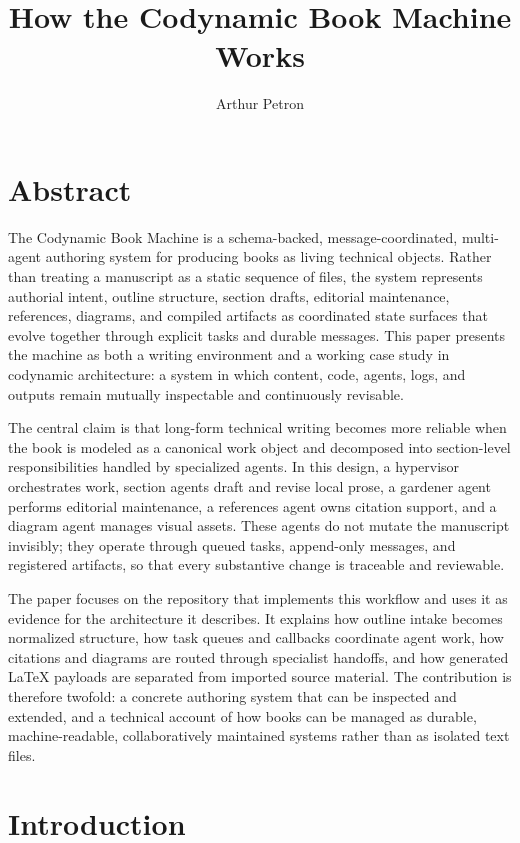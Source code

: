 \documentclass[11pt]{article}
\title{How the Codynamic Book Machine Works}
\author{Arthur Petron}
\begin{document}
\section{Abstract}


The Codynamic Book Machine is a schema-backed, message-coordinated, multi-agent authoring system for producing books as living technical objects. Rather than treating a manuscript as a static sequence of files, the system represents authorial intent, outline structure, section drafts, editorial maintenance, references, diagrams, and compiled artifacts as coordinated state surfaces that evolve together through explicit tasks and durable messages. This paper presents the machine as both a writing environment and a working case study in codynamic architecture: a system in which content, code, agents, logs, and outputs remain mutually inspectable and continuously revisable.

The central claim is that long-form technical writing becomes more reliable when the book is modeled as a canonical work object and decomposed into section-level responsibilities handled by specialized agents. In this design, a hypervisor orchestrates work, section agents draft and revise local prose, a gardener agent performs editorial maintenance, a references agent owns citation support, and a diagram agent manages visual assets. These agents do not mutate the manuscript invisibly; they operate through queued tasks, append-only messages, and registered artifacts, so that every substantive change is traceable and reviewable.

The paper focuses on the repository that implements this workflow and uses it as evidence for the architecture it describes. It explains how outline intake becomes normalized structure, how task queues and callbacks coordinate agent work, how citations and diagrams are routed through specialist handoffs, and how generated \LaTeX{} payloads are separated from imported source material. The contribution is therefore twofold: a concrete authoring system that can be inspected and extended, and a technical account of how books can be managed as durable, machine-readable, collaboratively maintained systems rather than as isolated text files.



\section{Introduction}
\end{document}
